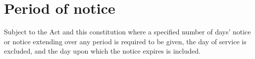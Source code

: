 \section{Period of notice}

Subject to the Act and this constitution where a specified number of days' notice or notice extending over any period is required to be given, the day of service is excluded, and the day upon which the notice expires is included. 